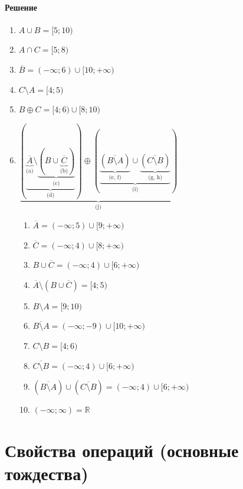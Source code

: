 \documentclass{article}
\begin{document}
\paragraph{Решение}
\begin{enumerate}
    \item $A \cup B = [5; 10)$
    \item $A \cap C = [5; 8)$
    \item $\overline{B} = (-\infty; 6) \cup[10; +\infty)$
    \item $C \setminus A = [4; 5)$
    \item $B \oplus C = [4; 6) \cup [8; 10)$
    \item $\underbrace{\left( \underbrace{\underbrace{\overline{A}}_{\text{(a)}} \setminus \underbrace{(B \cup \underbrace{\overline{C}}_{\text{(b)}})}_{\text{(c)}}}_{\text{(d)}} \right) \oplus 
                       \left( \underbrace{\underbrace{(\overline{B \setminus A})}_{\text{(e, f)}} \cup \underbrace{(\overline{C \setminus B})}_{\text{(g, h)}}}_{\text{(i)}} \right)}_{\text{(j)}}$
    \begin{enumerate}
        \item $\overline{A} = (-\infty; 5) \cup [9; +\infty)$
        \item $\overline{C} = (-\infty; 4) \cup [8; +\infty)$
        \item $B \cup \overline{C} = (-\infty; 4) \cup [6; +\infty)$
        \item $\overline{A} \setminus (B \cup \overline{C}) = [4; 5)$
        \item $B \setminus A = [9; 10)$
        \item $\overline{B \setminus A} = (-\infty; -9) \cup [10; +\infty)$
        \item $C \setminus B = [4; 6)$
        \item $\overline{C \setminus B} = (-\infty; 4) \cup [6; +\infty)$
        \item $(\overline{B \setminus A}) \cup (\overline{C \setminus B}) = (-\infty; 4) \cup [6; +\infty)$
        \item $(-\infty; \infty) = \mathbb{R}$
    \end{enumerate}
\end{enumerate}



\section{Свойства операций (основные тождества)}
\end{document}
